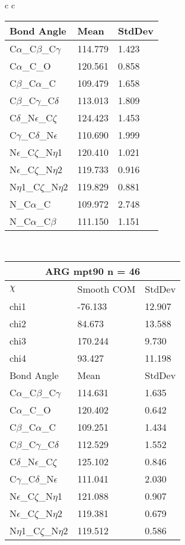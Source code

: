 \begin{longtable}{ c c }
\begin{tabular}{ l l l }
  Bond Angle   & Mean     & StdDev \\ \midrule
  C$\alpha$\_C$\beta$\_C$\gamma$ & 114.779 & 1.423\\
  C$\alpha$\_C\_O & 120.561 & 0.858\\
  C$\beta$\_C$\alpha$\_C & 109.479 & 1.658\\
  C$\beta$\_C$\gamma$\_C$\delta$ & 113.013 & 1.809\\
  C$\delta$\_N$\epsilon$\_C$\zeta$ & 124.423 & 1.453\\
  C$\gamma$\_C$\delta$\_N$\epsilon$ & 110.690 & 1.999\\
  N$\epsilon$\_C$\zeta$\_N$\eta$1 & 120.410 & 1.021\\
  N$\epsilon$\_C$\zeta$\_N$\eta$2 & 119.733 & 0.916\\
  N$\eta$1\_C$\zeta$\_N$\eta$2 & 119.829 & 0.881\\
  N\_C$\alpha$\_C & 109.972 & 2.748\\
  N\_C$\alpha$\_C$\beta$ & 111.150 & 1.151\\
  \bottomrule
  \end{tabular}
  \\
  \begin{tabular}{ l l l }
  \toprule
  \multicolumn{3}{c}{ARG \textbf{mpt90} n = 46} \\ \toprule
  $\chi$       & Smooth COM & StdDev \\ \midrule
  chi1 & -76.133 & 12.907 \\ 
  chi2 & 84.673 & 13.588 \\ 
  chi3 & 170.244 & 9.730 \\ 
  chi4 & 93.427 & 11.198 \\ \midrule
  Bond Angle   & Mean     & StdDev \\ \midrule
  C$\alpha$\_C$\beta$\_C$\gamma$ & 114.631 & 1.635\\
  C$\alpha$\_C\_O & 120.402 & 0.642\\
  C$\beta$\_C$\alpha$\_C & 109.251 & 1.434\\
  C$\beta$\_C$\gamma$\_C$\delta$ & 112.529 & 1.552\\
  C$\delta$\_N$\epsilon$\_C$\zeta$ & 125.102 & 0.846\\
  C$\gamma$\_C$\delta$\_N$\epsilon$ & 111.041 & 2.030\\
  N$\epsilon$\_C$\zeta$\_N$\eta$1 & 121.088 & 0.907\\
  N$\epsilon$\_C$\zeta$\_N$\eta$2 & 119.381 & 0.679\\
  N$\eta$1\_C$\zeta$\_N$\eta$2 & 119.512 & 0.586\\

\end{tabular}
\end{longtable}
